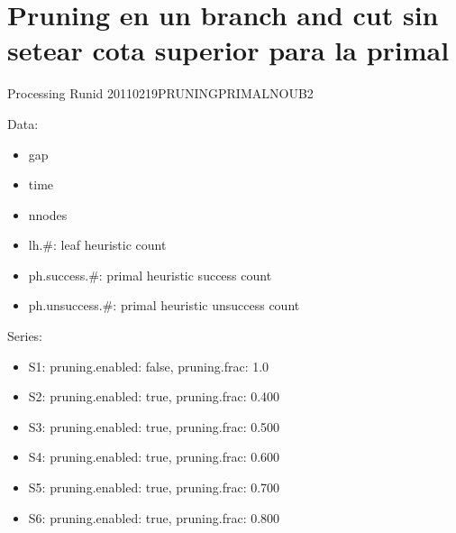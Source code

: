 \documentclass[landscape, 12pt]{report}
\begin{document}
\clearpage

\section*{Pruning en un branch and cut sin setear cota superior para la primal}

Processing Runid 20110219PRUNINGPRIMALNOUB2

Data:
\begin{itemize}
\item gap
\item time
\item nnodes
\item lh.\#: leaf heuristic count
\item ph.success.\#: primal heuristic success count
\item ph.unsuccess.\#: primal heuristic unsuccess count
\end{itemize}
Series:
\begin{itemize}
\item S1: pruning.enabled: false, pruning.frac: 1.0
\item S2: pruning.enabled: true, pruning.frac: 0.400
\item S3: pruning.enabled: true, pruning.frac: 0.500
\item S4: pruning.enabled: true, pruning.frac: 0.600
\item S5: pruning.enabled: true, pruning.frac: 0.700
\item S6: pruning.enabled: true, pruning.frac: 0.800
\end{itemize}
\end{document}
